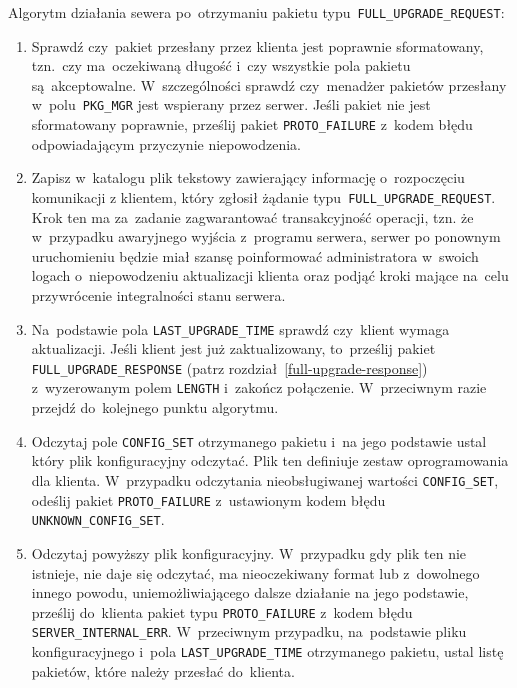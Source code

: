 \documentclass[thesis]{subfiles}
\begin{document}
Algorytm działania sewera po~otrzymaniu pakietu typu~\texttt{FULL\_UPGRADE\_REQUEST}:\mynobreakpar
\begin{enumerate}
	\item Sprawdź czy~pakiet przesłany przez klienta jest poprawnie sformatowany, tzn.~czy ma~oczekiwaną długość i~czy wszystkie pola pakietu są~akceptowalne. W~szczególności sprawdź czy~menadżer pakietów przesłany w~polu~\texttt{PKG\_MGR} jest wspierany przez serwer. Jeśli pakiet nie jest sformatowany poprawnie, prześlij pakiet \texttt{PROTO\_FAILURE} z~kodem błędu odpowiadającym przyczynie niepowodzenia.
	\item\label{create-file} Zapisz w~katalogu  plik tekstowy zawierający informację o~rozpoczęciu komunikacji z klientem, który zgłosił żądanie typu~\texttt{FULL\_UPGRADE\_REQUEST}. Krok ten ma za~zadanie zagwarantować transakcyjność operacji, tzn. że w~przypadku awaryjnego wyjścia z~programu serwera, serwer po ponownym uruchomieniu będzie miał szansę poinformować administratora w~swoich logach o~niepowodzeniu aktualizacji klienta oraz podjąć kroki mające na~celu przywrócenie integralności stanu serwera.
	\item Na~podstawie pola \texttt{LAST\_UPGRADE\_TIME} sprawdź czy~klient wymaga aktualizacji. Jeśli klient jest już zaktualizowany, to~prześlij pakiet \texttt{FULL\_UPGRADE\_RESPONSE} (patrz rozdział~\ref{full-upgrade-response}) z~wyzerowanym polem \texttt{LENGTH} i~zakończ połączenie. W~przeciwnym razie przejdź do~kolejnego punktu algorytmu.
	\item Odczytaj pole \texttt{CONFIG\_SET} otrzymanego pakietu i~na jego podstawie ustal który plik konfiguracyjny odczytać. Plik ten definiuje zestaw oprogramowania dla klienta. W~przypadku odczytania nieobsługiwanej wartości \texttt{CONFIG\_SET}, odeślij pakiet \texttt{PROTO\_FAILURE} z~ustawionym kodem błędu \texttt{UNKNOWN\_CONFIG\_SET}.
	\item Odczytaj powyższy plik konfiguracyjny. W~przypadku gdy plik ten nie istnieje, nie daje się odczytać, ma nieoczekiwany format lub z~dowolnego innego powodu, uniemożliwiającego dalsze działanie na jego podstawie, prześlij do~klienta pakiet typu \texttt{PROTO\_FAILURE} z~kodem błędu \texttt{SERVER\_INTERNAL\_ERR}. W~przeciwnym przypadku, na~podstawie pliku konfiguracyjnego i~pola \texttt{LAST\_UPGRADE\_TIME} otrzymanego pakietu, ustal listę pakietów, które należy przesłać do~klienta.

\end{enumerate}
\end{document}
